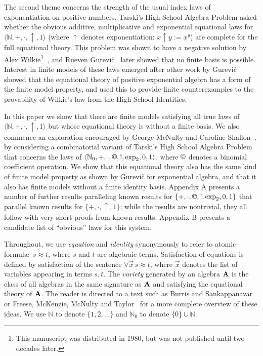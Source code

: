 \documentclass[eqnor,reqno]{amsart}
\theoremstyle{plain}
\theoremstyle{definition}
\newcommand{\cc}{\mathbin{\textup{\copyright}}}
\begin{document}
The second theme concerns the strength of the usual index laws of exponentiation on positive numbers.  
Tarski's High School Algebra Problem asked whether the obvious additive, multiplicative and exponential equational laws for $\langle\mathbb{N},+,\cdot,\uparrow,1\rangle$ (where $\uparrow$ denotes exponentiation: $x\uparrow y:=x^y$) are complete for the full equational theory.  
This problem was shown to have a negative solution by Alex Wilkie\footnote{This manuscript was distributed in 1980, but was not published until two decades later.}~\cite{wil03}, and Rueven Gurevi\v{c}~\cite{gur90} later showed that no finite basis is possible.  
Interest in finite models of these laws emerged after other work by Gurevi\v{c}~\cite{gur85} showed that the equational theory of positive exponential algebra has a form of the finite model property, and used this to provide finite counterexamples to the provability of Wilkie's law from the High School Identities.

In this paper we show that there are finite models satisfying all true laws of $\langle\mathbb{N},+,\cdot,\uparrow,1\rangle$ but whose equational theory is without a finite basis.  
We also commence an exploration encouraged by George McNulty and Caroline Shallon~\cite{mcn,mcnsha}, by considering a combinatorial variant of Tarski's High School Algebra Problem that concerns the laws of $\langle\mathbb{N}_0,+,\cdot,\cc,!,\exp_2,0,1\rangle$, where $\cc$ denotes a binomial coefficient operation.  
We show that this equational theory also has the same kind of finite model property as shown by Gurevi\v{c} for  exponential algebra, and that it also has finite models without a finite identity basis.  Appendix A presents a number of further results paralleling known results for $\{+,\cdot,\cc,!,\exp_2,0,1\}$ that parallel known results for $\{+,\cdot,\uparrow,1\}$; while the results are nontrivial, they all follow with very short proofs from known results.  Appendix B presents a candidate list of ``obvious'' laws for this system.


Throughout, we use \emph{equation} and \emph{identity} synonymously to refer to atomic formul{\ae}~$s\approx t$, where  $s$ and $t$ are algebraic terms.  Satisfaction of equations is defined by satisfaction of the sentence $\forall\vec{x}\, s\approx t$, where $\vec{x}$ denotes the list of variables appearing in terms $s,t$.  The \emph{variety} generated by an algebra ${\bf A}$ is the class of all algebras in the same signature as ${\bf A}$ and satisfying the equational theory of ${\bf A}$.  The reader is directed to a text such as Burris and Sankappanavar~\cite{bursan} or Freese, McKenzie, McNulty and Taylor~\cite{FMMT} for a more complete overview of these ideas.  We use $\mathbb{N}$ to denote $\{1,2,\dots\}$ and $\mathbb{N}_0$ to denote $\{0\}\cup\mathbb{N}$.
\end{document}
